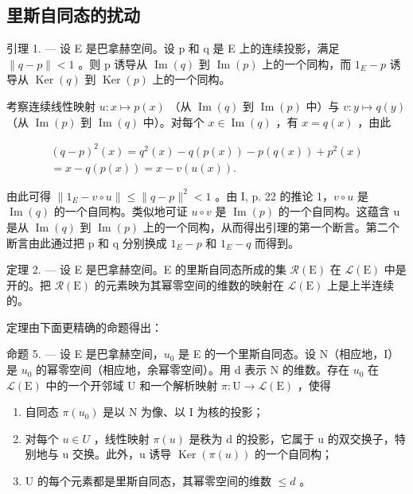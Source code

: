 \subsection{里斯自同态的扰动}

引理 1. --- 设 E 是巴拿赫空间。设 p 和 q 是 E 上的连续投影，满足 \(\|q - p\| < 1\) 。则 p 诱导从 \(\operatorname{Im}(q)\) 到 \(\operatorname{Im}(p)\) 上的一个同构，而 \(1_{E} - p\) 诱导从 \(\operatorname{Ker}(q)\) 到 \(\operatorname{Ker}(p)\) 上的一个同构。

考察连续线性映射 \(u\colon x\mapsto p(x)\) （从 \(\operatorname{Im}(q)\) 到 \(\operatorname{Im}(p)\) 中）与 \(v\colon y\mapsto q(y)\) （从 \(\operatorname{Im}(p)\) 到 \(\operatorname{Im}(q)\) 中）。对每个 \(x\in\operatorname{Im}(q)\) ，有 \(x=q(x)\) ，由此

\[
\begin{array}{c} (q - p) ^ {2} (x) = q ^ {2} (x) - q (p (x)) - p (q (x)) + p ^ {2} (x) \\ = x - q (p (x)) = x - v (u (x)). \end{array}
\]

由此可得 \(\|1_{E}-v\circ u\|\leqslant\|q-p\|^{2}<1\) 。由 I, p. 22 的推论 1，\(v\circ u\) 是 \(\operatorname{Im}(q)\) 的一个自同构。类似地可证 \(u\circ v\) 是 \(\operatorname{Im}(p)\) 的一个自同构。这蕴含 u 是从 \(\operatorname{Im}(q)\) 到 \(\operatorname{Im}(p)\) 上的一个同构，从而得出引理的第一个断言。第二个断言由此通过把 p 和 q 分别换成 \(1_{E}-p\) 和 \(1_{E}-q\) 而得到。

定理 2. --- 设 E 是巴拿赫空间。E 的里斯自同态所成的集 \(\mathcal{R}(\mathrm{E})\) 在 \(\mathcal{L}(\mathrm{E})\) 中是开的。把 \(\mathcal{R}(\mathrm{E})\) 的元素映为其幂零空间的维数的映射在 \(\mathcal{L}(\mathrm{E})\) 上是上半连续的。

定理由下面更精确的命题得出：

命题 5. --- 设 E 是巴拿赫空间，\(u_{0}\) 是 E 的一个里斯自同态。设 N（相应地，I）是 \(u_{0}\) 的幂零空间（相应地，余幂零空间）。用 d 表示 N 的维数。存在 \(u_{0}\) 在 \(\mathcal{L}(\mathrm{E})\) 中的一个开邻域 U 和一个解析映射 \(\pi\colon\mathrm{U}\to\mathcal{L}(\mathrm{E})\) ，使得

\begin{enumerate}
\def\labelenumi{(\roman{enumi})}
\item
  自同态 \(\pi(u_0)\) 是以 N 为像、以 I 为核的投影；
\item
  对每个 \(u \in U\) ，线性映射 \(\pi(u)\) 是秩为 d 的投影，它属于 u 的双交换子，特别地与 u 交换。此外，u 诱导 \(\operatorname{Ker}(\pi(u))\) 的一个自同构；
\item
  U 的每个元素都是里斯自同态，其幂零空间的维数 \(\leqslant d\) 。
\end{enumerate}

